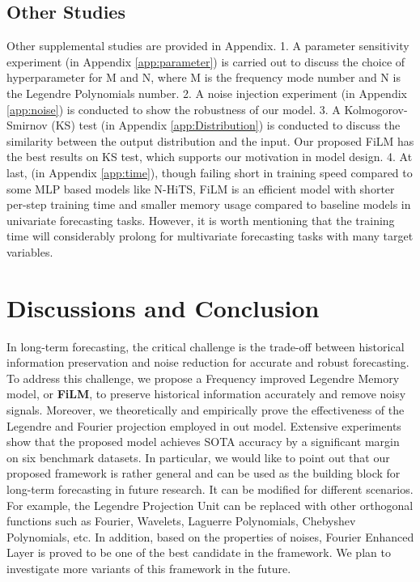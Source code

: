 \documentclass{article}
\begin{document}
\subsection{Other Studies}
Other supplemental studies are provided in Appendix. 1. A parameter sensitivity experiment (in Appendix \ref{app:parameter}) is carried out to discuss the choice of hyperparameter for M and N, where M is the frequency mode number and N is the Legendre Polynomials number. 2. A noise injection experiment (in Appendix \ref{app:noise}) is conducted to show the robustness of our model. 3. A Kolmogorov-Smirnov (KS) test (in Appendix \ref{app:Distribution}) is conducted to discuss the similarity between the output distribution and the input. Our proposed FiLM has the best results on KS test, which supports our motivation in model design. 4. At last, (in Appendix \ref{app:time}), though failing short in training speed compared to some MLP based models like N-HiTS\cite{challu2022n}, FiLM is an efficient model with shorter per-step training time and smaller memory usage compared to baseline models in univariate forecasting tasks. However, it is worth mentioning that the training time will considerably prolong for multivariate forecasting tasks with many target variables. 










 \section{Discussions and Conclusion}
\vspace{-2mm}
In long-term forecasting, the critical challenge is the trade-off between historical information preservation and noise reduction for accurate and robust forecasting. To address this challenge, we propose a Frequency improved Legendre Memory model, or {\bf FiLM}, to preserve historical information accurately and remove noisy signals. Moreover, we theoretically and empirically prove the effectiveness of the Legendre and Fourier projection employed in out model. Extensive experiments show that the proposed model achieves SOTA accuracy by a significant margin on six benchmark datasets. In particular, we would like to point out that our proposed framework is rather general and can be used as the building block for long-term forecasting in future research. It can be modified for different scenarios. For example, the Legendre Projection Unit can be replaced with other orthogonal functions such as Fourier, Wavelets, Laguerre Polynomials, Chebyshev Polynomials, etc. In addition, based on the properties of noises, Fourier Enhanced Layer is proved to be one of the best candidate in the framework. We plan to investigate more variants of this framework in the future. 
\end{document}
